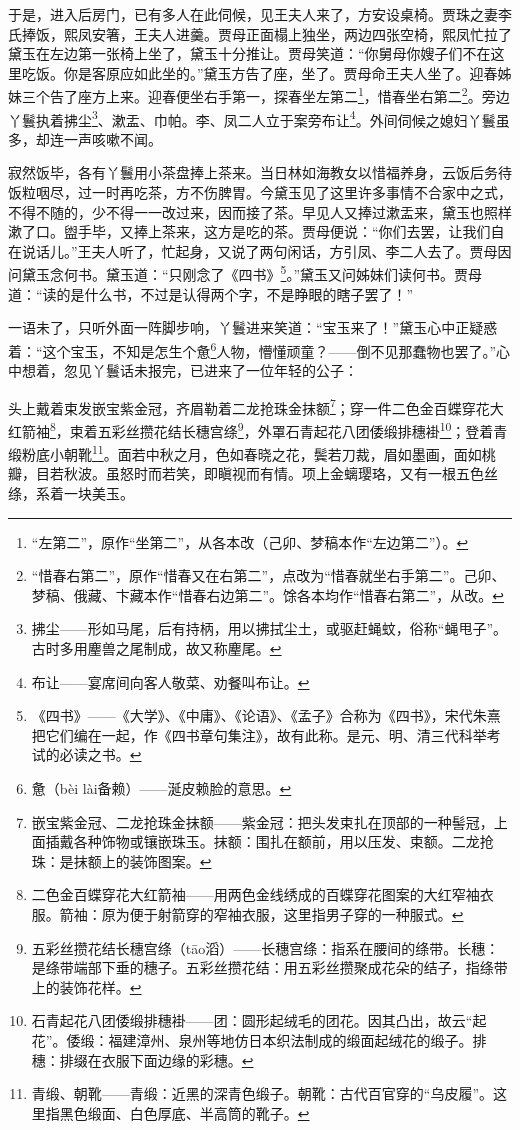 \par 于是，进入后房门，已有多人在此伺候，见王夫人来了，方安设桌椅。贾珠之妻李氏捧饭，熙凤安箸，王夫人进羹。贾母正面榻上独坐，两边四张空椅，熙凤忙拉了黛玉在左边第一张椅上坐了，黛玉十分推让。贾母笑道：“你舅母你嫂子们不在这里吃饭。你是客原应如此坐的。”黛玉方告了座，坐了。贾母命王夫人坐了。迎春姊妹三个告了座方上来。迎春便坐右手第一，探春坐左第二\footnote{“左第二”，原作“坐第二”，从各本改（己卯、梦稿本作“左边第二”）。}，惜春坐右第二\footnote{“惜春右第二”，原作“惜春又在右第二”，点改为“惜春就坐右手第二”。己卯、梦稿、俄藏、卞藏本作“惜春右边第二”。馀各本均作“惜春右第二”，从改。}。旁边丫鬟执着拂尘\footnote{拂尘——形如马尾，后有持柄，用以拂拭尘土，或驱赶蝇蚊，俗称“蝇甩子”。古时多用麈兽之尾制成，故又称麈尾。}、漱盂、巾帕。李、凤二人立于案旁布让\footnote{布让——宴席间向客人敬菜、劝餐叫布让。}。外间伺候之媳妇丫鬟虽多，却连一声咳嗽不闻。
\par 寂然饭毕，各有丫鬟用小茶盘捧上茶来。当日林如海教女以惜福养身，云饭后务待饭粒咽尽，过一时再吃茶，方不伤脾胃。今黛玉见了这里许多事情不合家中之式，不得不随的，少不得一一改过来，因而接了茶。早见人又捧过漱盂来，黛玉也照样漱了口。盥手毕，又捧上茶来，这方是吃的茶。贾母便说：“你们去罢，让我们自在说话儿。”王夫人听了，忙起身，又说了两句闲话，方引凤、李二人去了。贾母因问黛玉念何书。黛玉道：“只刚念了《四书》\footnote{《四书》——《大学》、《中庸》、《论语》、《孟子》合称为《四书》，宋代朱熹把它们编在一起，作《四书章句集注》，故有此称。是元、明、清三代科举考试的必读之书。}。”黛玉又问姊妹们读何书。贾母道：“读的是什么书，不过是认得两个字，不是睁眼的瞎子罢了！”
\par 一语未了，只听外面一阵脚步响，丫鬟进来笑道：“宝玉来了！”黛玉心中正疑惑着：“这个宝玉，不知是怎生个惫\footnote{惫（bèi lài备赖）——涎皮赖脸的意思。}人物，懵懂顽童？——倒不见那蠢物也罢了。”心中想着，忽见丫鬟话未报完，已进来了一位年轻的公子：
\par 头上戴着束发嵌宝紫金冠，齐眉勒着二龙抢珠金抹额\footnote{嵌宝紫金冠、二龙抢珠金抹额——紫金冠：把头发束扎在顶部的一种髻冠，上面插戴各种饰物或镶嵌珠玉。抹额：围扎在额前，用以压发、束额。二龙抢珠：是抹额上的装饰图案。}；穿一件二色金百蝶穿花大红箭袖\footnote{二色金百蝶穿花大红箭袖——用两色金线绣成的百蝶穿花图案的大红窄袖衣服。箭袖：原为便于射箭穿的窄袖衣服，这里指男子穿的一种服式。}，束着五彩丝攒花结长穗宫绦\footnote{五彩丝攒花结长穗宫绦（tāo滔）——长穗宫绦：指系在腰间的绦带。长穗：是绦带端部下垂的穗子。五彩丝攒花结：用五彩丝攒聚成花朵的结子，指绦带上的装饰花样。}，外罩石青起花八团倭缎排穗褂\footnote{石青起花八团倭缎排穗褂——团：圆形起绒毛的团花。因其凸出，故云“起花”。倭缎：福建漳州、泉州等地仿日本织法制成的缎面起绒花的缎子。排穗：排缀在衣服下面边缘的彩穗。}；登着青缎粉底小朝靴\footnote{青缎、朝靴——青缎：近黑的深青色缎子。朝靴：古代百官穿的“乌皮履”。这里指黑色缎面、白色厚底、半高筒的靴子。}。面若中秋之月，色如春晓之花，鬓若刀裁，眉如墨画，面如桃瓣，目若秋波。虽怒时而若笑，即瞋视而有情。项上金螭璎珞，又有一根五色丝绦，系着一块美玉。

